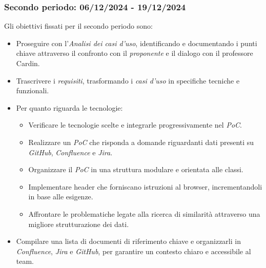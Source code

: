 \subsubsection{Secondo periodo: 06/12/2024 - 19/12/2024}
\label{sec:prev_cons_secondo_periodo}
Gli obiettivi fissati per il secondo periodo sono:
    \begin{itemize}
        \item Proseguire con l’\emph{Analisi dei casi d’uso}, identificando e documentando i punti chiave attraverso il confronto con il \emph{proponente} e il dialogo con il professore Cardin.
        \item Trascrivere i \emph{requisiti}, trasformando i \emph{casi d’uso} in specifiche tecniche e funzionali.
        \item Per quanto riguarda le tecnologie:
        \begin{itemize}
            \item Verificare le tecnologie scelte e integrarle progressivamente nel \emph{PoC}.
            \item Realizzare un \emph{PoC} che risponda a domande riguardanti dati presenti su \emph{GitHub}, \emph{Confluence} e \emph{Jira}.
            \item Organizzare il \emph{PoC} in una struttura modulare e orientata alle classi.
            \item Implementare header che forniscano istruzioni al browser, incrementandoli in base alle esigenze.
            \item Affrontare le problematiche legate alla ricerca di similarità attraverso una migliore strutturazione dei dati.
        \end{itemize}
        \item Compilare una lista di documenti di riferimento chiave e organizzarli in \emph{Confluence}, \emph{Jira} e \emph{GitHub}, per garantire un contesto chiaro e accessibile al team.
    \end{itemize}
    

